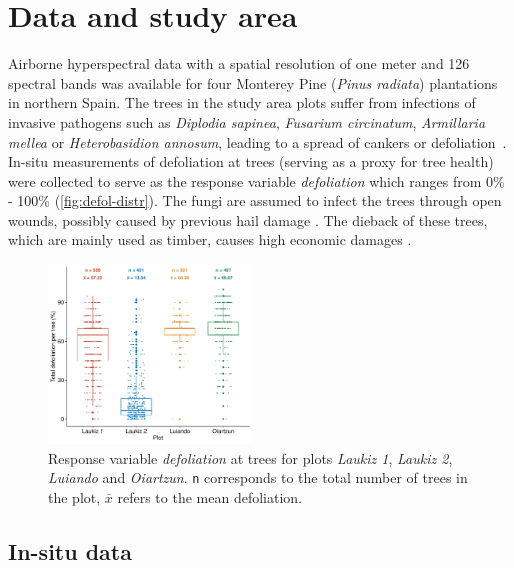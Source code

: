 \documentclass[letterpaper, peerreview]{IEEEtran}
\begin{document}
\section{Data and study area}

\noindent Airborne hyperspectral data with a spatial resolution of one meter and 126 spectral bands was available for four Monterey Pine (\textit{Pinus radiata}) plantations in northern Spain.
The trees in the study area plots suffer from infections of invasive pathogens such as \textit{Diplodia sapinea}, \textit{Fusarium circinatum}, \textit{Armillaria mellea} or \textit{Heterobasidion annosum}, leading to a spread of cankers or defoliation~\cite{mesanza2016, iturritxa2017}.
In-situ measurements of defoliation at trees (serving as a proxy for tree health) were collected to serve as the response variable \textit{defoliation} which ranges from 0\% - 100\% (\autoref{fig:defol-distr}). %
The fungi are assumed to infect the trees through open wounds, possibly caused by previous hail damage \cite{iturritxa2014}.
The dieback of these trees, which are mainly used as timber, causes high economic damages \cite{ganley2009}.

\begin{figure} [t!]
	\centering
	\begin{center}
		\includegraphics[width=0.48\textwidth] {defoliation-distribution-plot-1.pdf}
		\caption{Response variable \textit{defoliation} at trees for plots \textit{Laukiz 1}, \textit{Laukiz 2}, \textit{Luiando} and \textit{Oiartzun}. \texttt{n} corresponds to the total number of trees in the plot, $\bar{x}$ refers to the mean defoliation.}\label{fig:defol-distr}
	\end{center}
\end{figure}

\subsection{In-situ data}
\end{document}
